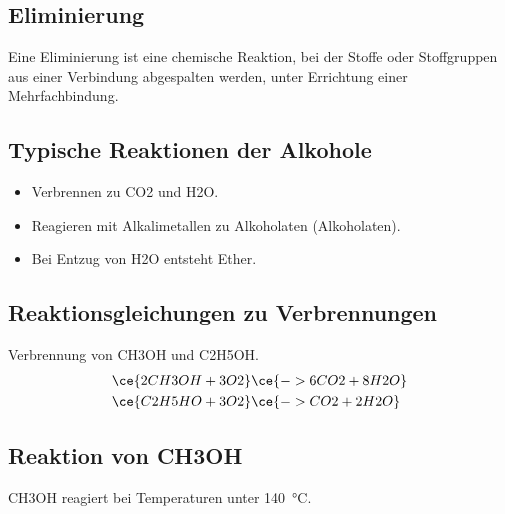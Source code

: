 \subsection{Eliminierung}
Eine Eliminierung ist eine chemische Reaktion,
bei der Stoffe oder Stoffgruppen aus einer Verbindung abgespalten werden,
unter Errichtung einer Mehrfachbindung.

{

\centering\hspace{-2em}

}

\subsection{Typische Reaktionen der Alkohole}
\begin{itemize}
	\item Verbrennen zu \ac{CO2} und \ac{H2O}.
	\item Reagieren mit Alkalimetallen zu Alkoholaten (Alkoholaten).
	\item Bei Entzug von \ac{H2O} entsteht Ether.
\end{itemize}

\subsection{Reaktionsgleichungen zu Verbrennungen}
Verbrennung von \ac{CH3OH} und \ac{C2H5OH}.
\begin{align}
	\ce{2CH3OH + 3O2}	& \ce{-> 6CO2 + 8H2O} \\
	\ce{C2H5HO + 3O2}	& \ce{-> CO2 + 2H2O}
\end{align}

\subsection{Reaktion von \acl{CH3OH}}
\ac{CH3OH} reagiert bei Temperaturen unter \SI[detect-weight]{140}{\degreeCelsius}.


